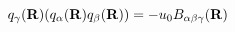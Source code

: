 \begin{equation}                      
q_{\gamma}({\bf R}) (q_{\alpha}({\bf R}) q_{\beta}({\bf R})) = - u_{0}                       
B_{\alpha \beta \gamma}({\bf R})                      
\end{equation} 
